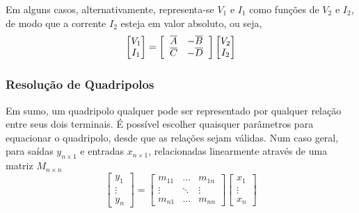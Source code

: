 \documentclass{article}
\numberwithin{equation}{section}
\begin{document}
Em alguns casos, alternativamente, representa-se $V_{1}$ e $I_{1}$ como funções de $V_{2}$ e $I_{2}$, de modo que a corrente $I_{2}$ esteja em valor absoluto, ou seja,
\begin{equation*}
    \begin{bmatrix}
        V_{1} \\
        I_{1}
    \end{bmatrix}
    = %
    \begin{bmatrix}
        \hspace{0.2cm} \overline{A} & -\overline{B} \hspace{0.2cm} \\
        \hspace{0.2cm} \overline{C} & -\overline{D} \hspace{0.2cm}
    \end{bmatrix}
    \begin{bmatrix}
        V_{2} \\
        I_{2}
    \end{bmatrix}
\end{equation*}

\subsubsection{Resolução de Quadripolos}
\label{subsubsec:quadripolosgenerico}
Em sumo, um quadripolo qualquer pode ser representado por qualquer relação entre seus dois terminais. É possível escolher quaisquer parâmetros para equacionar o quadripolo, desde que as relações sejam válidas. Num caso geral, para saídas $y_{n\times1}$ e entradas $x_{n\times1}$, relacionadas linearmente através de uma matriz $M_{n\times n}$
\begin{equation*}
    \begin{bmatrix}
        y_{1} \\
        \vdots\\
        y_{n}
    \end{bmatrix}
    = %
    \begin{bmatrix}
        m_{11} & \dots & m_{1n}\\
        \vdots & \ddots& \vdots\\
        m_{n1} & \dots & m_{nn}
    \end{bmatrix}
    \begin{bmatrix}
        x_{1} \\
        \vdots\\
        x_{n}
    \end{bmatrix}
\end{equation*}
\end{document}
